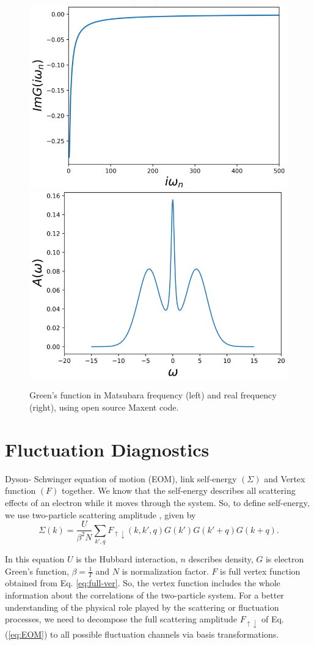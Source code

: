 \begin{figure}[ht]
\centering
    \includegraphics[width=0.46\linewidth]{fig2/matsu.png}
    \includegraphics[width=0.46\linewidth]{fig2/real.png}
        \caption{\label{fig:matsu}Green's function in Matsubara frequency (left) and real frequency (right), using open source Maxent code.}
\end{figure}

\section{Fluctuation Diagnostics}

Dyson- Schwinger equation of motion (EOM), link self-energy $(\Sigma)$ and Vertex function $(F)$ together. We know that the self-energy describes all scattering effects of an electron while it moves through the system. So, to define self-energy, we use two-particle scattering amplitude \cite{Toschi}, given by 
\begin{equation}
    \Sigma(k)= \frac{U}{\beta^2N}\sum_{k',q}F_{\uparrow\downarrow}(k,k',q)G(k')G(k'+q)G(k+q).
    \label{eq:EOM}
\end{equation}

In this equation $U$ is the Hubbard interaction, $n$ describes density, $G$ is electron Green's function, $\beta=\frac{1}{T}$ and $N$ is normalization factor. $F$ is full vertex function obtained from Eq. \ref{eq:full-ver}. So, the vertex function includes the whole information about the correlations of the two-particle system. For a better understanding of the physical role played by the scattering or fluctuation processes, we need to decompose the full scattering amplitude $F_{\uparrow\downarrow}$ of Eq. (\ref{eq:EOM}) to all possible fluctuation channels via basis transformations. 


